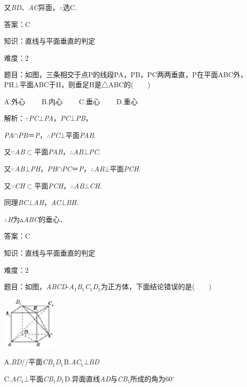 \documentclass{article} %
\begin{document}
又\textit{BD}、\textit{AC}异面，$\mathrm{\therefore}$选C.

答案：C

知识：直线与平面垂直的判定

难度：2

题目：如图，三条相交于点P的线段PA，PB，PC两两垂直，P在平面ABC外，PH$\bot$平面ABC于H，则垂足H是△ABC的(　　)

A.外心　　	B.内心　　	C.垂心　　	D.重心

解析：$\mathrm{\because}$\textit{PC}$\mathrm{\bot}$\textit{PA}，\textit{PC}$\mathrm{\bot}$\textit{PB}，

\textit{PA}$\mathrm{\cap}$\textit{PB}＝\textit{P}，$\mathrm{\therefore}$\textit{PC}$\mathrm{\bot}$平面\textit{PAB}.

又$\mathrm{\because}$\textit{AB}$\mathrm{\subset }$平面\textit{PAB}，$\mathrm{\therefore}$\textit{AB}$\mathrm{\bot}$\textit{PC}.

又$\mathrm{\because}$\textit{AB}$\mathrm{\bot}$\textit{PH}，\textit{PH}$\mathrm{\cap}$\textit{PC}＝\textit{P}，$\mathrm{\therefore}$\textit{AB}$\mathrm{\bot}$平面\textit{PCH}.

又$\mathrm{\because}$\textit{CH}$\mathrm{\subset }$平面\textit{PCH}，$\mathrm{\therefore}$\textit{AB}$\mathrm{\bot}$\textit{CH}.

同理\textit{BC}$\mathrm{\bot}$\textit{AH}，\textit{AC}$\mathrm{\bot}$\textit{BH}.

$\mathrm{\therefore}$\textit{H}为$\mathrm{\vartriangle}$\textit{ABC}的垂心．

答案：C

知识：直线与平面垂直的判定

难度：2

题目：如图，\textit{ABCD}-\textit{A}${}_{1}$\textit{B}${}_{1}$\textit{C}${}_{1}$\textit{D}${}_{1}$为正方体，下面结论错误的是(　　)

\includegraphics*[width=1.07in, height=1.02in, keepaspectratio=false]{image203}

A.\textit{BD}//平面\textit{CB}${}_{1}$\textit{D}${}_{1}$${}_{  }$B.\textit{AC}${}_{1}$$\mathrm{\bot}$\textit{BD}

C.\textit{AC}${}_{1}$$\mathrm{\bot}$平面\textit{CB}${}_{1}$\textit{D}${}_{1}$${}_{  }$D.异面直线\textit{AD}与\textit{CB}${}_{1}$所成的角为60$\mathrm{{}^\circ}$
\end{document}
